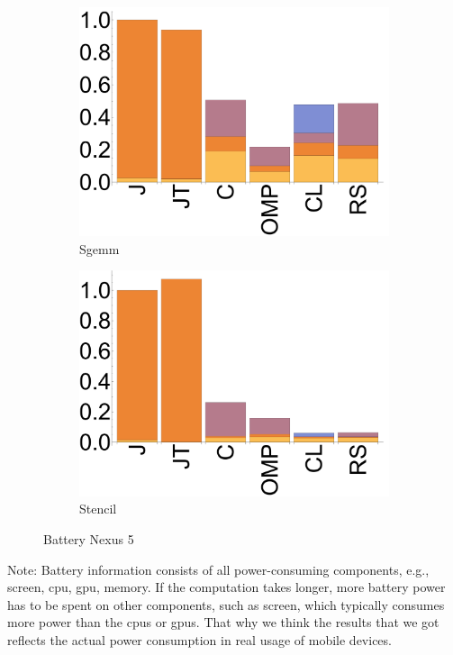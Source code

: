 \begin{figure}[ht]
  \begin{subfigure}[b]{0.5\textwidth}
      \centering
      \includegraphics[width=\textwidth]{data/bbattery_sgemm_nexus5.pdf}
      \caption{Sgemm}\label{fig:Sgemm}
  \end{subfigure}
  \begin{subfigure}[b]{0.5\textwidth}
      \centering
      \includegraphics[width=\textwidth]{data/bbattery_stencil_nexus5.pdf}
      \caption{Stencil}
      \label{fig:Stencil}
  \end{subfigure}

  \caption{Battery Nexus 5}
\end{figure}

Note: Battery information consists of all power-consuming components, e.g., screen,
cpu, gpu, memory. If the computation takes longer, more battery power has to
be spent on other components, such as screen, which typically consumes more
power than the cpus or gpus. That why we think the results that we got
reflects the actual power consumption in real usage of mobile devices.

